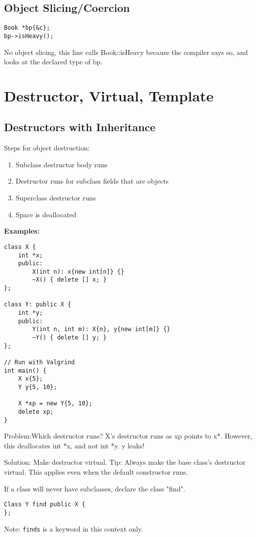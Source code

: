 \documentclass[12pt]{article}
\begin{document}
\subsection{Object Slicing/Coercion}
\begin{lstlisting}
Book *bp{&c};
bp->isHeavy();
\end{lstlisting}
No object slicing, this line calls Book::isHeavy because the compiler says so, and looks at the declared type of bp.

\section{Destructor, Virtual, Template}
\subsection{Destructors with Inheritance}
Steps for object destruction:
\begin{enumerate}
    \item Subclass destructor body runs
    \item Destructor runs for subclass fields that are objects
    \item Superclass destructor runs
    \item Space is deallocated
\end{enumerate}
\textbf{Examples:}
\begin{lstlisting}
class X {
    int *x;
    public:
        X(int n): x{new int[n]} {}
        ~X() { delete [] x; }
};

class Y: public X {
    int *y;
    public:
        Y(int n, int m): X{n}, y{new int[m]} {}
        ~Y() { delete [] y; }
};

// Run with Valgrind
int main() {
    X x{5};
    Y y{5, 10};
    
    X *xp = new Y{5, 10};
    delete xp; 
}
\end{lstlisting}
Problem:Which destructor runs? X's destructor runs as xp points to x*. However, this deallocates int *x, and not int *y. y leaks!

Solution: Make destructor virtual. 
Tip: Always make the base class's destructor virtual. This applies even when the default constructor runs.

If a class will never have subclasses, declare the class "find".
\begin{lstlisting}
Class Y find public X {
};
\end{lstlisting}
Note: \lstinline{finds} is a keyword in this context only. 
\end{document}
